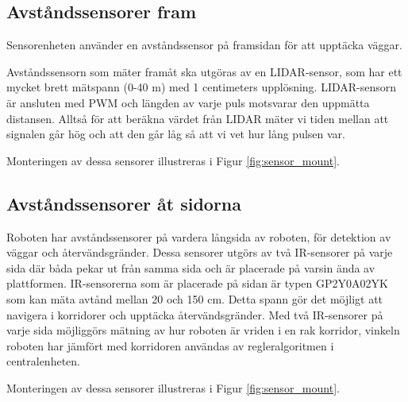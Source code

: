 \documentclass[a4paper,titlepage,12pt]{article}
\begin{document}
    \subsection{Avståndssensorer fram}
        Sensorenheten använder en avståndssensor på framsidan för att upptäcka väggar.

        Avståndssensorn som mäter framåt ska utgöras av en LIDAR-sensor, som har
	    ett mycket brett mätspann (0-40 m) med 1 centimeters upplösning. LIDAR-sensorn
	    är ansluten med PWM och längden av varje puls motsvarar den uppmätta distansen.
	    Alltså för att beräkna värdet från LIDAR mäter vi tiden	mellan att signalen går
	    hög och att den går låg så att vi vet hur lång pulsen var.

	    Monteringen av dessa sensorer illustreras i Figur \ref{fig:sensor_mount}.

        \subsection{Avståndssensorer åt sidorna}
        Roboten har avståndssensorer på vardera långsida av roboten, för
        detektion av väggar och återvändsgränder. Dessa sensorer utgörs av två
        IR-sensorer på varje sida där båda pekar ut från samma sida och
        är placerade på varsin ända av plattformen. IR-sensorerna som är placerade
        på sidan är typen GP2Y0A02YK som kan mäta avtånd mellan 20 och 150 cm.
        Detta spann gör det möjligt att navigera i korridorer och upptäcka
        återvändsgränder. Med två IR-sensorer på varje sida möjliggörs mätning av hur
        roboten är vriden i en rak korridor, vinkeln roboten har jämfört med
        korridoren användas av regleralgoritmen i centralenheten.

	    Monteringen av dessa sensorer illustreras i Figur \ref{fig:sensor_mount}.
\end{document}
